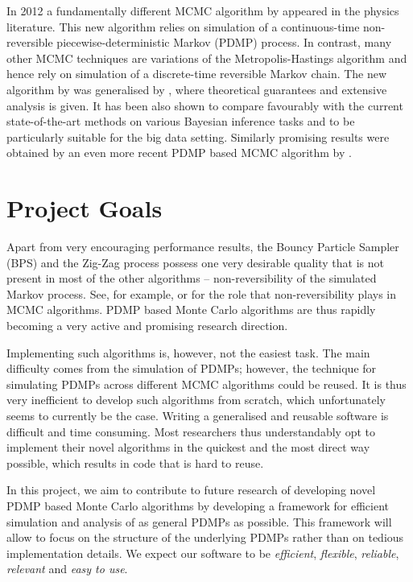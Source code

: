 \documentclass[report.tex]{subfiles}
\begin{document}
In 2012 a fundamentally different MCMC algorithm by \citet{peters2012rejection}
appeared in the physics literature. This new algorithm relies on simulation of
a continuous-time non-reversible piecewise-deterministic Markov (PDMP) process. In
contrast, many other MCMC techniques are variations of the
Metropolis-Hastings algorithm and hence rely on simulation of a discrete-time
reversible Markov chain.
The new algorithm by \citet{peters2012rejection}
was generalised by \citet{bouchard2015bouncy},
where theoretical guarantees and extensive analysis is given.
It has been also shown to compare favourably with the current
state-of-the-art methods on various Bayesian inference tasks and to be
particularly suitable for the big data setting.
Similarly promising results were obtained by an even more recent PDMP based
MCMC algorithm by \citet{bierkens2016zig}.

\section{Project Goals}
\label{project-goals-section}

Apart from very encouraging performance results, the Bouncy Particle Sampler (BPS)
\cite{peters2012rejection, bouchard2015bouncy}
and the Zig-Zag process \cite{bierkens2016zig}
possess one very desirable quality that is not present in most of the other algorithms --
non-reversibility of the simulated Markov process.
See, for example, \citet{neal2004improving} or \citet{sun2010improving} for the role
that non-reversibility plays in MCMC algorithms.
PDMP based Monte Carlo algorithms are thus rapidly becoming a very active and promising
research direction.

Implementing such algorithms is, however, not the easiest task.
The main difficulty comes from the simulation of
PDMPs; however, the technique for simulating PDMPs across different MCMC algorithms
could be reused.
It is thus very inefficient to develop such algorithms from
scratch, which unfortunately seems to currently be the case.
Writing a generalised and
reusable software is difficult and time consuming.
Most researchers thus understandably opt to implement their novel algorithms in
the quickest and the most direct way possible, which results in code that is
hard to reuse.

In this project, we aim to contribute to future research of developing
novel PDMP based Monte Carlo algorithms by developing a framework for efficient
simulation and analysis of as general PDMPs as possible.
This framework will allow to focus on the structure of the underlying PDMPs rather
than on tedious implementation details.
We expect our software to be \textit{efficient}, \textit{flexible},
\textit{reliable}, \textit{relevant} and \textit{easy to use}.
\end{document}
